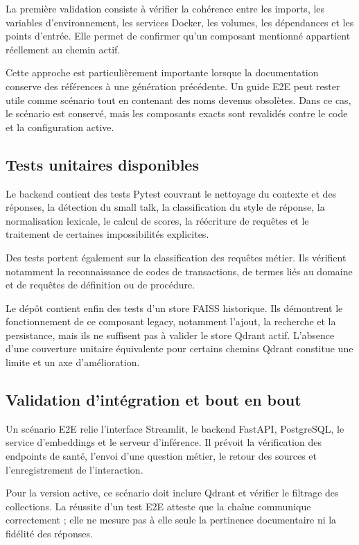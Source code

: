 La première validation consiste à vérifier la cohérence entre les imports, les variables d'environnement, les services Docker, les volumes, les dépendances et les points d'entrée. Elle permet de confirmer qu'un composant mentionné appartient réellement au chemin actif.

Cette approche est particulièrement importante lorsque la documentation conserve des références à une génération précédente. Un guide E2E peut rester utile comme scénario tout en contenant des noms devenus obsolètes. Dans ce cas, le scénario est conservé, mais les composants exacts sont revalidés contre le code et la configuration active.

\subsection{Tests unitaires disponibles}

Le backend contient des tests Pytest couvrant le nettoyage du contexte et des réponses, la détection du small talk, la classification du style de réponse, la normalisation lexicale, le calcul de scores, la réécriture de requêtes et le traitement de certaines impossibilités explicites.

Des tests portent également sur la classification des requêtes métier. Ils vérifient notamment la reconnaissance de codes de transactions, de termes liés au domaine et de requêtes de définition ou de procédure.

Le dépôt contient enfin des tests d'un store FAISS historique. Ils démontrent le fonctionnement de ce composant legacy, notamment l'ajout, la recherche et la persistance, mais ils ne suffisent pas à valider le store Qdrant actif. L'absence d'une couverture unitaire équivalente pour certains chemins Qdrant constitue une limite et un axe d'amélioration.

\subsection{Validation d'intégration et bout en bout}

Un scénario E2E relie l'interface Streamlit, le backend FastAPI, PostgreSQL, le service d'embeddings et le serveur d'inférence. Il prévoit la vérification des endpoints de santé, l'envoi d'une question métier, le retour des sources et l'enregistrement de l'interaction.

Pour la version active, ce scénario doit inclure Qdrant et vérifier le filtrage des collections. La réussite d'un test E2E atteste que la chaîne communique correctement ; elle ne mesure pas à elle seule la pertinence documentaire ni la fidélité des réponses.

